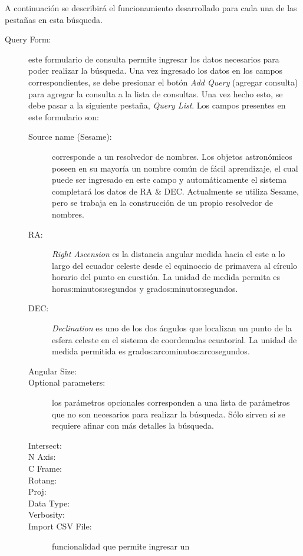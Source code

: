 A continuación se describirá el funcionamiento desarrollado para cada
una de las pestañas en esta búsqueda.

\begin{description}
  \item [Query Form:] este formulario de consulta permite ingresar los
    datos necesarios para poder realizar la búsqueda. Una vez
    ingresado los datos en los campos correspondientes, se debe
    presionar el botón \emph{Add Query} (agregar consulta) para
    agregar la consulta a la lista de consultas. Una vez hecho esto,
    se debe pasar a la siguiente pestaña, \emph{Query List}. Los
    campos presentes en este formulario son:
    \begin{description}
      \item [Source name (Sesame):] corresponde a un resolvedor de
	nombres. Los objetos astronómicos poseen en su mayoría un
	nombre común de fácil aprendizaje, el cual puede ser ingresado
	en este campo y automáticamente el sistema completará los
	datos de RA \& DEC. Actualmente se utiliza Sesame, pero se
	trabaja en la construcción de un propio resolvedor de nombres.
      \item [RA:] \emph{Right Ascension} es la distancia angular
	medida hacia el este a lo largo del ecuador celeste desde el
	equinoccio de primavera al círculo horario del punto en
	cuestión. La unidad de medida permita es
	horas:minutos:segundos y grados:minutos:segundos.
      \item [DEC:] \emph{Declination} es uno de los dos ángulos que
	localizan un punto de la esfera celeste en el sistema de
	coordenadas ecuatorial. La unidad de medida permitida es
	grados:arcominutos:arcosegundos.
      \item [Angular Size:] 
      \item [Optional parameters:] los parámetros opcionales
	corresponden a una lista de parámetros que no son necesarios
	para realizar la búsqueda. Sólo sirven si se requiere afinar
	con más detalles la búsqueda.
      \item [Intersect:]
      \item [N Axis:]
      \item [C Frame:]
      \item [Rotang:]
      \item [Proj:]
      \item [Data Type:]
      \item [Verbosity:]
      \item [Import CSV File:] funcionalidad que permite ingresar un

\end{description}
\end{description}
